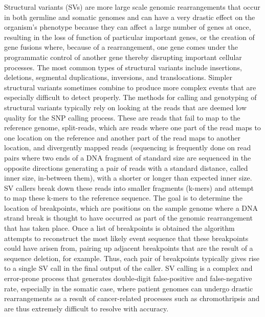 Structural variants (SVs) are more large scale genomic rearrangements that occur in both germline and somatic genomes and can have a very drastic effect on the organism's phenotype because they can affect a large number of genes at once, resulting in the loss of function of particular important genes, or the creation of gene fusions where, because of a rearrangement, one gene comes under the programmatic control of another gene thereby disrupting important cellular processes. The most common types of structural variants include insertions, deletions, segmental duplications, inversions, and translocations. Simpler structural variants sometimes combine to produce more complex events that are especially difficult to detect properly. The methods for calling and genotyping of structural variants typically rely on looking at the reads that are deemed low quality for the SNP calling process. These are reads that fail to map to the reference genome, split-reads, which are reads where one part of the read maps to one location on the reference and another part of the read maps to another location, and divergently mapped reads (sequencing is frequently done on read pairs where two ends of a DNA fragment of standard size are sequenced in the opposite directions generating a pair of reads with a standard distance, called inner size, in-between them), with a shorter or longer than expected inner size. SV callers break down these reads into smaller fragments (k-mers) and attempt to map these k-mers to the reference sequence. The goal is to determine the location of breakpoints, which are positions on the sample genome where a DNA strand break is thought to have occurred as part of the genomic rearrangement that has taken place. Once a list of breakpoints is obtained the algorithm attempts to reconstruct the most likely event sequence that these breakpoints could have arisen from, pairing up adjacent breakpoints that are the result of a sequence deletion, for example. Thus, each pair of breakpoints typically gives rise to a single SV call in the final output of the caller. SV calling is a complex and error-prone process that generates double-digit false-positive and false-negative rate, especially in the somatic case, where patient genomes can undergo drastic rearrangements as a result of cancer-related processes such as chromothripsis\autocite{korbel2013criteria} and are thus extremely difficult to resolve with accuracy.


